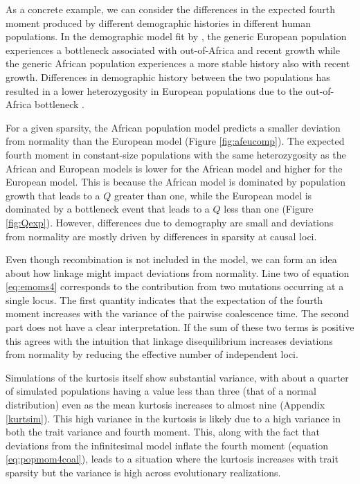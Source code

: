 As a concrete example, we can consider the differences in the expected fourth
moment produced by different demographic histories in different human
populations. In the demographic model fit by \citet{Tennessen2012}, the generic
European population experiences a bottleneck associated with out-of-Africa and
recent growth while the generic African population experiences a more stable
history also with recent growth. Differences in demographic history between the
two populations has resulted in a lower heterozygosity in European populations
due to the out-of-Africa bottleneck \citep{Yu2002}.

For a given sparsity, the African population model predicts a smaller deviation
from normality than the European model (Figure \ref{fig:afeucomp}). The expected
fourth moment in constant-size populations with the same heterozygosity as the
African and European models is lower for the African model and higher for the
European model. This is because the African model is dominated by population
growth that leads to a $Q$ greater than one, while the European model is
dominated by a bottleneck event that leads to a $Q$ less than one (Figure
\ref{fig:Qexp}). However, differences due to demography are small and deviations
from normality are mostly driven by differences in sparsity at causal loci.

Even though recombination is not included in the model, we can form an idea
about how linkage might impact deviations from normality. Line two of
equation \eqref{eq:emoms4} corresponds to the contribution from two mutations
occurring at a single locus. The first quantity indicates that the expectation
of the fourth moment increases with the variance of the pairwise coalescence
time. The second part does not have a clear interpretation. If the sum of these
two terms is positive this agrees with the intuition that linkage disequilibrium
increases deviations from normality by reducing the effective number of
independent loci.

Simulations of the kurtosis itself show substantial variance, with about a
quarter of simulated populations having a value less than three (that of a
normal distribution) even as the mean kurtosis increases to almost nine
(Appendix \ref{kurtsim}). This high variance in the kurtosis is likely due to a
high variance in both the trait variance and fourth moment. This, along with the
fact that deviations from the infinitesimal model inflate the fourth moment
(equation \eqref{eq:popmom4coal}), leads to a situation where the kurtosis
increases with trait sparsity but the variance is high across evolutionary
realizations.
